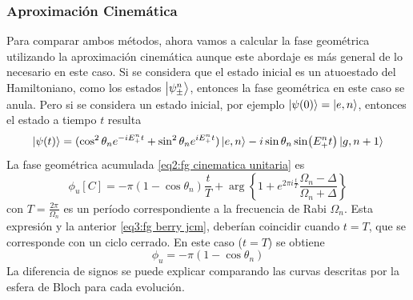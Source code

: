 \subsubsection{Aproximación Cinemática}
Para comparar ambos métodos, ahora vamos a calcular la fase geométrica utilizando la aproximación cinemática aunque este abordaje es más general de lo necesario en este caso.
Si se considera que el estado inicial es un atuoestado del Hamiltoniano, como los estados $\ket{\psi_\pm^n}$, entonces la fase geométrica en este caso se anula. Pero si se considera un estado inicial, por ejemplo $\ket{\psi(0)}=\ket{e,n}$, entonces el estado a tiempo $t$ resulta
\begin{equation}\label{eq3:fg berry jcm}
    \ket{\psi(t)}=(\cos^2\theta_ne^{-iE_+^nt}+\sin^2\theta_ne^{iE_+^nt})\ket{e,n}-i \sin\theta_n\sin(E_+^nt)\ket{g,n+1}
\end{equation}
La fase geométrica acumulada \ref{eq2:fg cinematica unitaria} es
\begin{equation}\label{eq3:fg unitaria jcm}
    \phi_u[C]=-\pi(1-\cos\theta_n)\frac{t}{T} +\arg\left\{ 1+e^{2\pi i \frac{t}{T}}\frac{\Omega_n-\Delta}{\Omega_n+\Delta} \right\}
\end{equation}
con $T=\frac{2\pi}{\Omega_n}$ es un período correspondiente a la frecuencia de Rabi $\Omega_n$. Esta expresión y la anterior \ref{eq3:fg berry jcm}, deberían coincidir cuando $t=T$, que se corresponde con un ciclo cerrado. En este caso ($t=T$) se obtiene
\begin{equation}
    \phi_u=-\pi(1-\cos\theta_n)
\end{equation}
La diferencia de signos se puede explicar comparando las curvas descritas por la esfera de Bloch para cada evolución. 

